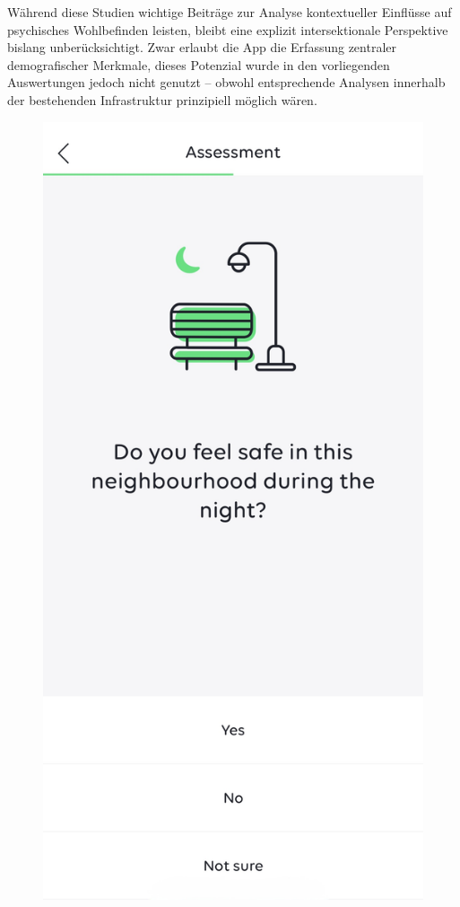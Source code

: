 Während diese Studien wichtige Beiträge zur Analyse kontextueller Einflüsse auf psychisches Wohlbefinden leisten, bleibt eine explizit intersektionale Perspektive bislang unberücksichtigt. Zwar erlaubt die App die Erfassung zentraler demografischer Merkmale, dieses Potenzial wurde in den vorliegenden Auswertungen jedoch nicht genutzt -- obwohl entsprechende Analysen innerhalb der bestehenden Infrastruktur prinzipiell möglich wären.


\begin{figure}[h]
    \centering
    \begin{minipage}[t]{0.38\textwidth}
        \centering
        \includegraphics[width=\textwidth]{Arbeit/images/urban_mind01.jpeg}

\end{minipage}
\end{figure}
